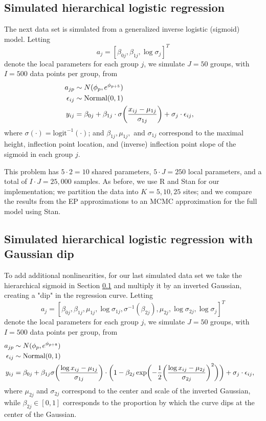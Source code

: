 \subsection{Simulated hierarchical logistic regression}
\label{subsec:ep_application_logistic}

The next data set is simulated from a generalized inverse logistic (sigmoid) model. Letting
$$ a_j = [\beta_{0j}, \beta_{1j}, \log \sigma_j]^T$$
denote the local parameters for each group $j$, we simulate $J = 50$ groups, with $I = 500$ data points per group, from
\begin{align}
a_{jp} &\sim N(\phi_p, e^{ \phi_{p+5} } ) && \\\nonumber
\epsilon_{ij}  &\sim \text{Normal}(0,1) && \\\nonumber
y_{ij}  &= \beta_{0j} + \beta_{1j} \cdot \sigma \biggl( \frac{ x_{ij} - \mu_{1j} }{ \sigma_{1j} } \biggr) + \sigma_j \cdot \epsilon_{ij},
\end{align}
where $\sigma(\cdot) = \text{logit}^{-1}(\cdot)$; and $\beta_{1j}, \mu_{1j},$ and $\sigma_{1j}$ correspond to the maximal height, inflection point location, and (inverse) inflection point slope of the sigmoid in each group $j$.

This problem has $5 \cdot 2 = 10$ shared parameters, $5 \cdot J = 250$ local parameters, and a total of $I \cdot J = 25,000$ samples. As before, we use R and Stan for our implementation; we partition the data into $K = 5, 10, 25$ sites; and we compare the results from the EP approximations to an MCMC approximation for the full model using Stan.

\subsection{Simulated hierarchical logistic regression with Gaussian dip}
\label{subsec:ep_application_logistic_dip}

To add additional nonlinearities, for our last simulated data set we take the hierarchical sigmoid in Section \ref{subsec:ep_application_logistic} and multiply it by an inverted Gaussian, creating a "dip" in the regression curve. Letting
$$ a_j = [\beta_{0j}, \beta_{1j}, \mu_{1j}, \log \sigma_{1j}, \sigma^{-1}(\beta_{2j}), \mu_{2j}, \log \sigma_{2j}, \log \sigma_j]^T$$
denote the local parameters for each group $j$, we simulate $J = 50$ groups, with $I = 500$ data points per group, from
\begin{align}
a_{jp} &\sim N(\phi_p, e^{ \phi_{p+8} } ) && \\\nonumber
\epsilon_{ij} &\sim \text{Normal}(0,1) && \\\nonumber
y_{ij} &= \beta_{0j} + \beta_{1j} \sigma \biggl( \frac{ \log x_{ij} - \mu_{1j} }{ \sigma_{1j} } \biggr) \cdot \biggl( 1 - \beta_{2j} \exp \biggl( -\frac{1}{2} \bigg( \frac{ \log x_{ij} - \mu_{2j} }{ \sigma_{2j} } \biggr)^2 \biggr) \biggr) + \sigma_j \cdot \epsilon_{ij},
\end{align}
where $\mu_{2j}$ and $\sigma_{2j}$ correspond to the center and scale of the inverted Gaussian, while $\beta_{2j} \in [0,1]$ corresponds to the proportion by which the curve dips at the center of the Gaussian.

